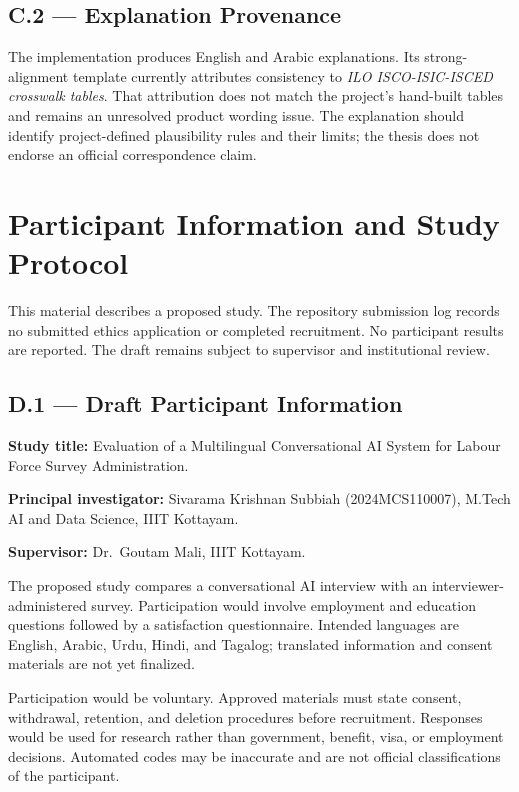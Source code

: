 \section*{C.2 --- Explanation Provenance}

The implementation produces English and Arabic explanations. Its
strong-alignment template currently attributes consistency to
\emph{ILO ISCO-ISIC-ISCED crosswalk tables}. That attribution does not match
the project's hand-built tables and remains an unresolved product wording
issue. The explanation should identify project-defined plausibility
rules and their limits; the thesis does not endorse an official
correspondence claim.

\chapter{Participant Information and Study Protocol}
\label{app:consent}

This material describes a proposed study. The repository submission log
records no submitted ethics application or completed recruitment.
No participant results are reported. The draft remains subject to
supervisor and institutional review.

\section*{D.1 --- Draft Participant Information}

\noindent\textbf{Study title:}
Evaluation of a Multilingual Conversational AI System for Labour Force
Survey Administration.

\noindent\textbf{Principal investigator:}
Sivarama Krishnan Subbiah (2024MCS110007), M.Tech AI and Data Science,
IIIT Kottayam.

\noindent\textbf{Supervisor:}
Dr.\ Goutam Mali, IIIT Kottayam.

The proposed study compares a conversational AI interview with an
interviewer-administered survey. Participation would involve employment
and education questions followed by a satisfaction questionnaire.
Intended languages are English, Arabic, Urdu, Hindi, and Tagalog;
translated information and consent materials are not yet finalized.

Participation would be voluntary. Approved materials must state consent,
withdrawal, retention, and deletion procedures before recruitment.
Responses would be used for research rather than government, benefit,
visa, or employment decisions. Automated codes may be inaccurate and are
not official classifications of the participant.

